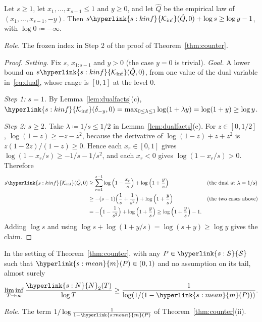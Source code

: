\documentclass[11pt]{article}
\newcommand{\sy}[2]{{\hyperlink{#1}{#2}}}
\newcommand{\Sm}{\sy{s:S}{\mathcal{S}}}
\newcommand{\mean}{\sy{s:mean}{m}}
\newcommand{\Kinf}{\sy{s:kinf}{\mathcal{K}_{\inf}}}
\newcommand{\Np}{\sy{s:N}{N}}
\begin{document}
\begin{lemma}\label{lem:jump}
Let $s\ge1$, let $x_1,\dots,x_{s-1}\le1$ and $y\ge0$, and let $\hat Q$ be the empirical law of
$(x_1,\dots,x_{s-1},-y)$. Then $s\Kinf(\hat Q,0)+\log s\ge\log y-1$, with $\log0\coloneqq-\infty$.
\end{lemma}

\emph{Role.} The frozen index in Step 2 of the proof of Theorem~\ref{thm:counter}.

\begin{proof}
\emph{Setting.} Fix $s$, $x_{1:s-1}$ and $y>0$ (the case $y=0$ is trivial). \emph{Goal.} A lower
bound on $s\Kinf(\hat Q,0)$, from one value of the dual variable in~\eqref{eq:dual}, whose range
is $[0,1]$ at the level $0$.

\emph{Step 1: $s=1$.} By Lemma~\ref{lem:dualfacts}(c),
$\Kinf(\delta_{-y},0)=\max_{0\le\lambda\le1}\log(1+\lambda y)=\log(1+y)\ge\log y$.

\emph{Step 2: $s\ge2$.} Take $\lambda\coloneqq1/s\le1/2$ in Lemma~\ref{lem:dualfacts}(c). For
$z\in[0,1/2]$, $\log(1-z)\ge-z-z^2$, because the derivative of $\log(1-z)+z+z^2$ is
$z(1-2z)/(1-z)\ge0$. Hence each $x_r\in[0,1]$ gives
$\log(1-x_r/s)\ge-1/s-1/s^2$, and each $x_r<0$ gives $\log(1-x_r/s)>0$. Therefore
\begin{align*}
  s\Kinf(\hat Q,0)&\ge\sum_{r=1}^{s-1}\log\Big(1-\frac{x_r}{s}\Big)+\log\Big(1+\frac ys\Big)
    &&\text{(the dual at $\lambda=1/s$)}\\
  &\ge-(s-1)\Big(\frac1s+\frac1{s^2}\Big)+\log\Big(1+\frac ys\Big)&&\text{(the two cases above)}\\
  &=-\Big(1-\frac1{s^2}\Big)+\log\Big(1+\frac ys\Big)\ge\log\Big(1+\frac ys\Big)-1.
\end{align*}
Adding $\log s$ and using $\log s+\log(1+y/s)=\log(s+y)\ge\log y$ gives the claim.
\end{proof}

\begin{lemma}\label{lem:explore}
In the setting of Theorem~\ref{thm:counter}, with any $P\in\Sm$ such that $\mean(P)\in(0,1)$ and no
assumption on its tail, almost surely
\[
  \liminf_{T\to\infty}\frac{\Np_2(T)}{\log T}\ge\frac{1}{\log(1/(1-\mean(P)))}.
\]
\end{lemma}

\emph{Role.} The term $1/\log\frac1{1-\mean(P)}$ of Theorem~\ref{thm:counter}(ii).
\end{document}
